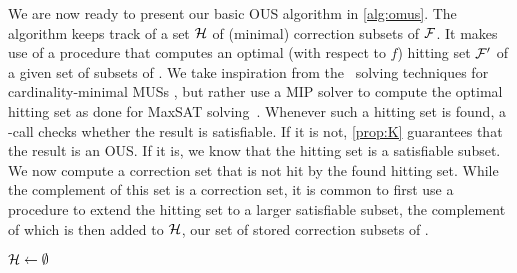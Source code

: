 We are now ready to present our basic OUS algorithm in \cref{alg:omus}. 
The algorithm keeps track of a set $\mathcal{H}$ of (minimal) correction subsets of $\mathcal{F} $. 
It makes use of a procedure \ohs that computes an optimal (with respect to $f$) hitting set $\mathcal{F} '$  of a given set of subsets of \formula. 
We take inspiration from the \hitsetbased~solving techniques for cardinality-minimal MUSs \cite{ignatiev2015smallest}, but rather use a MIP solver to compute the optimal hitting set as done for MaxSAT solving~\cite{DBLP:conf/sat/DaviesB13}.
Whenever such a hitting set is found, a \sat-call checks whether the result is satisfiable. If it is not, \cref{prop:K} guarantees that the result is an OUS. 
If it is, we know that the hitting set is a satisfiable subset. We now compute a correction set that is not hit by the found hitting set.
While the complement of this set is a correction set, it is common to  first use a procedure \grow to extend the hitting set to a larger satisfiable subset, the complement of which is then added to $\mathcal{H}$, our set of stored correction subsets of \formula.

% 


% 

\begin{algorithm}[ht]
  \DontPrintSemicolon
  $\mathcal{H}   \gets \emptyset$ \; %
  \While{true}{
    $\F' \gets \ohs(\setstohit,f) $ \label{smus-hs}\label{hs:omus} \;%
    \If{ $\lnot \sat(\F')$}{
      \Return{$\F'$} \;
    }
    $\F'' \gets  \grow(\F',\F) $\;
    $\setstohit  \gets \setstohit  \cup \{  \formula \setminus \F''\}$ \;
  }
  \caption{$\omus(\formula,f)$ }
  \label{alg:omus}
\end{algorithm}

